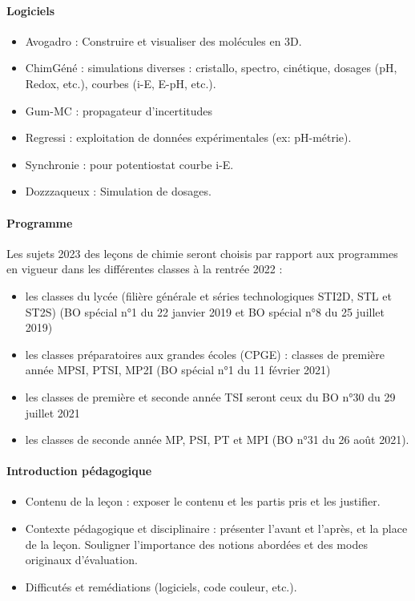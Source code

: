 \documentclass[11pt]{report}
\numberwithin{figure}{section}
\numberwithin{equation}{section}
\numberwithin{table}{section}
\newcommand{\1}{\boldsymbol{1}}
\begin{document}
\paragraph{Logiciels}
\begin{itemize}
\item Avogadro : Construire et visualiser des molécules en 3D.
\item ChimGéné : simulations diverses : cristallo, spectro, cinétique, dosages (pH, Redox, etc.), courbes (i-E, E-pH, etc.).
\item Gum-MC : propagateur d'incertitudes
\item Regressi : exploitation de données expérimentales (ex: pH-métrie).
\item Synchronie : pour potentiostat courbe i-E.
\item Dozzzaqueux : Simulation de dosages.
\end{itemize}

\paragraph{Programme}

Les sujets 2023 des leçons de chimie seront choisis par rapport aux programmes en vigueur dans les
différentes classes à la rentrée 2022 :
\begin{itemize}
\item les classes du lycée (filière générale et séries technologiques STI2D, STL et ST2S) (BO spécial
n°1 du 22 janvier 2019 et BO spécial n°8 du 25 juillet 2019)
\item les classes préparatoires aux grandes écoles (CPGE) : classes de première année MPSI, PTSI,
MP2I (BO spécial n°1 du 11 février 2021)
\item les classes de première et seconde année TSI seront ceux du BO n°30 du 29 juillet 2021
\item les classes de seconde année MP, PSI, PT et MPI (BO n°31 du 26 août 2021). 
\end{itemize}

\paragraph*{Introduction pédagogique}

\begin{itemize}
\item Contenu de la leçon : exposer le contenu et les partis pris et les justifier.
\item Contexte pédagogique et disciplinaire : présenter l'avant et l'après, et la place de la leçon. Souligner l'importance des notions abordées et des modes originaux d'évaluation.
\item Difficutés et remédiations (logiciels, code couleur, etc.).
\end{itemize}
\end{document}
